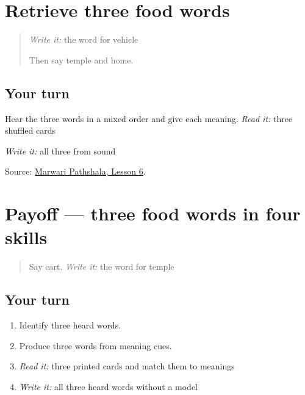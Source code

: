 \section[Practice]{Retrieve three food words}

\label{lesson:MW-R18-food-three}



\begin{quote}
\emph{Write it:} the word for vehicle

Then say temple and home.
\end{quote}

\subsection*{Your turn}
Hear the three words in a mixed order and give each meaning. \emph{Read it:} three shuffled cards

\emph{Write it:} all three from sound

\begin{tcolorbox}[breakable,colback=teal!4,colframe=teal!35!black,title={Before you move on}]
Source: \href{https://www.marwaripathshala.com/marwari-lesson-6-english}{Marwari Pathshala, Lesson 6}.
\end{tcolorbox}
\section[Practice]{Payoff — three food words in four skills}

\label{lesson:MW-C18-food-three}



\begin{quote}
Say cart. \emph{Write it:} the word for temple
\end{quote}

\subsection*{Your turn}
\begin{enumerate}
\raggedright
  \item Identify three heard words.
  \item Produce three words from meaning cues.
  \item \emph{Read it:} three printed cards and match them to meanings
  \item \emph{Write it:} all three heard words without a model
\end{enumerate}

